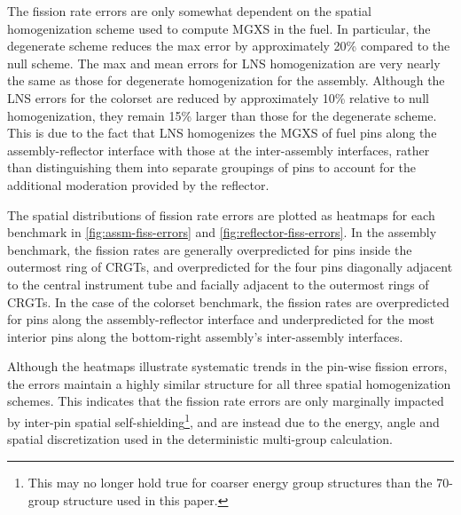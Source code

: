 The fission rate errors are only somewhat dependent on the spatial homogenization scheme used to compute MGXS in the fuel. In particular, the degenerate scheme reduces the max error by approximately 20\% compared to the null scheme. The max and mean errors for LNS homogenization are very nearly the same as those for degenerate homogenization for the assembly. Although the LNS errors for the colorset are reduced by approximately 10\% relative to null homogenization, they remain 15\% larger than those for the degenerate scheme. This is due to the fact that LNS homogenizes the MGXS of fuel pins along the assembly-reflector interface with those at the inter-assembly interfaces, rather than distinguishing them into separate groupings of pins to account for the additional moderation provided by the reflector.

The spatial distributions of fission rate errors are plotted as heatmaps for each benchmark in \autoref{fig:assm-fiss-errors} and \autoref{fig:reflector-fiss-errors}. In the assembly benchmark, the fission rates are generally overpredicted for pins inside the outermost ring of CRGTs, and overpredicted for the four pins diagonally adjacent to the central instrument tube and facially adjacent to the outermost rings of CRGTs. In the case of the colorset benchmark, the fission rates are overpredicted for pins along the assembly-reflector interface and underpredicted for the most interior pins along the bottom-right assembly's inter-assembly interfaces.

Although the heatmaps illustrate systematic trends in the pin-wise fission errors, the errors maintain a highly similar structure for all three spatial homogenization schemes. This indicates that the fission rate errors are only marginally impacted by inter-pin spatial self-shielding\footnote{This may no longer hold true for coarser energy group structures than the 70-group structure used in this paper.}, and are instead due to the energy, angle and spatial discretization used in the deterministic multi-group calculation.


\clearpage

